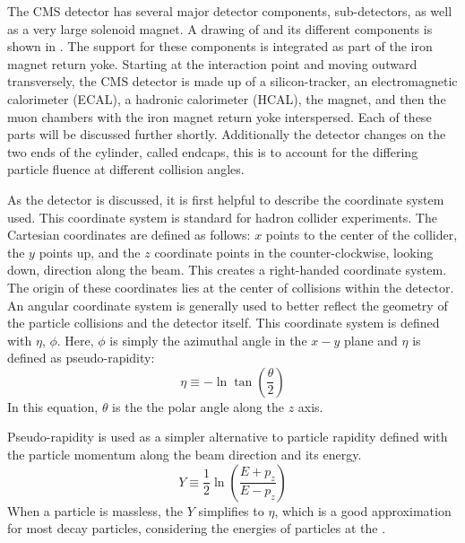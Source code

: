 The CMS detector has several major detector components, sub-detectors, as well as a very large solenoid magnet. A drawing of \CMS and its different components is shown in \cite{Sakuma_2014}. The support for these components is integrated as part of the iron magnet return yoke.  Starting at the interaction point and moving outward transversely, the CMS detector is made up of a silicon-tracker, an electromagnetic calorimeter (ECAL), a hadronic calorimeter (HCAL), the magnet, and then the muon chambers with the iron magnet return yoke interspersed.  Each of these parts will be discussed further shortly. Additionally the detector changes on the two ends of the cylinder, called endcaps, this is to account for the differing particle fluence at different collision angles.  

As the \CMS detector is discussed, it is first helpful to describe the coordinate system used.  This coordinate system is standard for hadron collider experiments.  The Cartesian coordinates are defined as follows: \ensuremath{x} points to the center of the collider, the \ensuremath{y} points up, and the \ensuremath{z} coordinate points in the counter-clockwise, looking down, direction along the beam.  This creates a right-handed coordinate system.  The origin of these coordinates lies at the center of collisions within the detector.  An angular coordinate system is generally used to better reflect the geometry of the particle collisions and the detector itself.  This coordinate system is defined with \ensuremath{\eta}, \ensuremath{\phi}.  Here, \ensuremath{\phi} is simply the azimuthal angle in the \ensuremath{x-y} plane and \ensuremath{\eta} is defined as pseudo-rapidity:
\begin{equation}
    \eta \equiv - \ln{
    \tan \left(\frac{\theta}{2}\right) }
    \label{eq:pseudorapidity}
\end{equation}
In this equation, \ensuremath{\theta} is the the polar angle along the \ensuremath{z} axis.

Pseudo-rapidity is used as a simpler alternative to particle rapidity defined with the particle momentum along the beam direction and its energy.
\begin{equation}
    Y \equiv \frac{1}{2} \ln{\left( \frac{E+p_z}{E-p_z} \right)}
    \label{eq:rapidity}
\end{equation}
When a particle is massless, the \ensuremath{Y} simplifies to \ensuremath{\eta}, which is a good approximation for most decay particles, considering the energies of particles at the \LHC.

